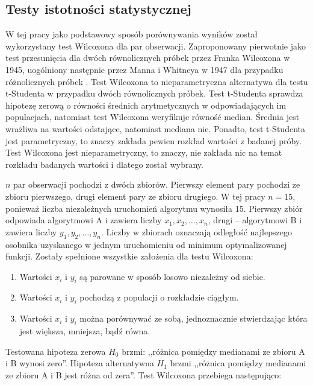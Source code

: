 \documentclass[a4paper,onecolumn,oneside,11pt,wide,floatssmall]{mwrep}
\theoremstyle{definition}
\theoremstyle{plain}%
\theoremstyle{remark}
\begin{document}
\subsection{Testy istotności statystycznej}

W tej pracy jako podstawowy sposób porównywania wyników został wykorzystany test 
Wilcoxona dla par obserwacji. Zaproponowany pierwotnie jako test przesunięcia dla dwóch równolicznych 
próbek przez Franka Wilcoxona w 1945, uogólniony następnie przez Manna i Whitneya w 1947
dla przypadku różnolicznych próbek \cite{mann}. Test Wilcoxona to nieparametryczna alternatywa dla testu t-Studenta w 
przypadku dwóch równolicznych próbek. Test t-Studenta sprawdza hipotezę zerową o równości
średnich arytmetycznych w odpowiadających im populacjach, natomiast test Wilcoxona
weryfikuje równość median. Średnia jest wrażliwa na wartości odstające,
natomiast mediana nie. Ponadto, test t-Studenta jest parametryczny, to znaczy zakłada pewien rozkład
wartości z badanej próby. Test Wilcoxona jest nieparametryczny, to znaczy,
nie zakłada nic na temat rozkładu badanych wartości i dlatego został wybrany.

$n$ par obserwacji pochodzi z dwóch zbiorów. Pierwszy element pary pochodzi ze zbioru pierwszego, drugi element pary 
ze zbioru drugiego. W tej pracy $n=15$,
ponieważ liczba niezależnych uruchomień algorytmu wynosiła 15. Pierwszy zbiór odpowiada algorytmowi A i zawiera
liczby $x_1, x_2, \dots, x_{n}$, drugi -- algorytmowi B i zawiera liczby $y_1, y_2, \dots, y_{n}$. 
Liczby w zbiorach oznaczają odległość najlepszego osobnika uzyskanego w jednym uruchomieniu
od minimum optymalizowanej funkcji. Zostały spełnione wszystkie założenia dla testu Wilcoxona:

\begin{enumerate}
 \item Wartości $x_i$ i $y_i$ są parowane w sposób losowo niezależny od siebie. 
 \item Wartości $x_i$ i $y_i$ pochodzą z populacji o rozkładzie ciągłym.
 \item Wartości $x_i$ i $y_i$ można porównywać ze sobą, jednoznacznie stwierdzając która jest większa, mniejsza,
bądź równa.
\end{enumerate}

Testowana hipoteza zerowa $H_0$ brzmi: ,,różnica pomiędzy medianami ze zbioru A i B wynosi zero''.
Hipoteza alternatywna $H_1$ brzmi ,,różnica pomiędzy medianami ze zbioru A i B jest różna od zera''.
Test Wilcoxona przebiega następująco:
\end{document}
